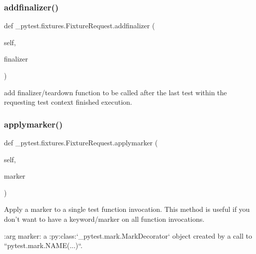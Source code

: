\subsubsection{\texorpdfstring{addfinalizer()}{addfinalizer()}}
{\footnotesize\ttfamily def \+\_\+pytest.\+fixtures.\+Fixture\+Request.\+addfinalizer (\begin{DoxyParamCaption}\item[{}]{self,  }\item[{}]{finalizer }\end{DoxyParamCaption})}

\begin{DoxyVerb}add finalizer/teardown function to be called after the
last test within the requesting test context finished
execution. \end{DoxyVerb}
 \mbox{\label{class__pytest_1_1fixtures_1_1_fixture_request_a0e23d2c6b917b1732e1cff59040c0f94}} 
\subsubsection{\texorpdfstring{applymarker()}{applymarker()}}
{\footnotesize\ttfamily def \+\_\+pytest.\+fixtures.\+Fixture\+Request.\+applymarker (\begin{DoxyParamCaption}\item[{}]{self,  }\item[{}]{marker }\end{DoxyParamCaption})}

\begin{DoxyVerb}Apply a marker to a single test function invocation.
This method is useful if you don't want to have a keyword/marker
on all function invocations.

:arg marker: a :py:class:`_pytest.mark.MarkDecorator` object
    created by a call to ``pytest.mark.NAME(...)``.
\end{DoxyVerb}
 \mbox{\label{class__pytest_1_1fixtures_1_1_fixture_request_a775e63459d22474875baaff278273220}} 
